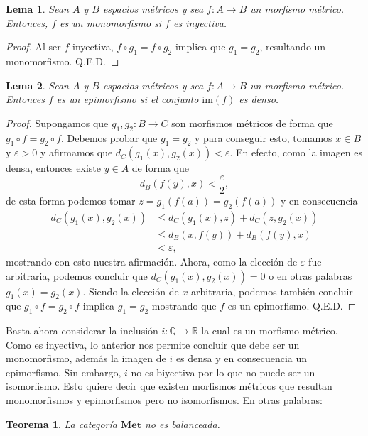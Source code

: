 \documentclass[letter,10pt,notitlepage]{amsart}
\newtheorem{theorem}{Teorema}
\newtheorem{lemma}{Lema}
\theoremstyle{definition}
\theoremstyle{remark}
\begin{document}
\begin{lemma}
  Sean \( A\) y \( B\) espacios métricos y sea \( f \colon A \to B\)
  un morfismo métrico. Entonces, \( f\) es un monomorfismo si
  \( f\) es inyectiva.
\end{lemma}
\begin{proof}
  Al ser \( f\) inyectiva, \( f \circ g_1 = f \circ g_2\) implica
  que \( g_1 = g_2\), resultando un monomorfismo. Q.E.D.
\end{proof}

\begin{lemma}
  Sean \( A\) y \( B\) espacios métricos y sea \( f \colon A \to B\)
  un morfismo métrico. Entonces \( f\) es un epimorfismo si
  el conjunto \( \mathrm{im}(f)\) es denso.
\end{lemma}
\begin{proof}
  Supongamos que \( g_1,g_2 \colon B \to C\) son morfismos métricos de forma
  que \( g_1 \circ f = g_2 \circ f\). Debemos probar que \( g_1 = g_2\) y
  para conseguir esto, tomamos \( x \in B\) y \( \varepsilon>0\) y afirmamos
  que \( d_C(g_1(x),g_2(x)) < \varepsilon\). En efecto, como
  la imagen es densa, entonces existe \( y \in A\) de forma que
  \[ d_B(f(y),x) < \frac{\varepsilon}{2},\]
  de esta forma podemos tomar \( z = g_1(f(a)) = g_2(f(a))\) y en
  consecuencia
  \begin{align*}
    d_C(g_1(x),g_2(x)) &\leq d_C(g_1(x), z) + d_C(z,g_2(x)) \\
    &\leq d_B(x,f(y)) + d_B(f(y),x) \\
    &< \varepsilon,
  \end{align*}
  mostrando con esto nuestra afirmación. Ahora, 
  como la elección de \( \varepsilon\) fue arbitraria, podemos
  concluir que \( d_C(g_1(x),g_2(x)) = 0\) o en otras palabras
  \( g_1(x) = g_2(x)\). Siendo la elección de \( x\) arbitraria,
  podemos también concluir que \( g_1 \circ f = g_2 \circ f\)
  implica \( g_1 = g_2\) mostrando que \( f\) es un epimorfismo. Q.E.D.
\end{proof}

Basta ahora considerar la inclusión \( i \colon \mathbb{Q} \to \mathbb{R}\)
la cual es un morfismo métrico. Como es inyectiva, lo anterior nos
permite concluir que debe ser un monomorfismo, además la imagen de \( i\)
es densa y en consecuencia un epimorfismo.  Sin embargo, 
\( i\) no es biyectiva por lo que no puede ser un isomorfismo. Esto
quiere decir que existen morfismos métricos que resultan monomorfismos
y epimorfismos pero no isomorfismos. En otras palabras:

\begin{theorem}
  La categoría \( \mathbf{Met}\) no es balanceada.
\end{theorem}
\end{document}
